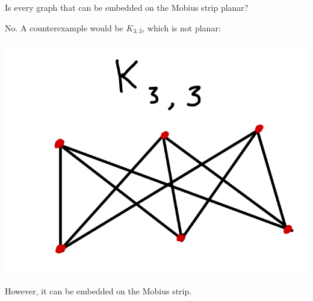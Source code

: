 \documentclass[12pt]{article}
\begin{document}
\begin{statement}
  Is every graph that can be embedded on the Mobius strip planar?
\end{statement}
\begin{newproof}
  No. A counterexample would be $K_{3,3}$, which is not planar: 
  \par \begin{center} \includegraphics[scale=.2]{5-1.png} \end{center}
  However, it can be embedded on the Mobius strip.
\end{newproof}
\end{document}
